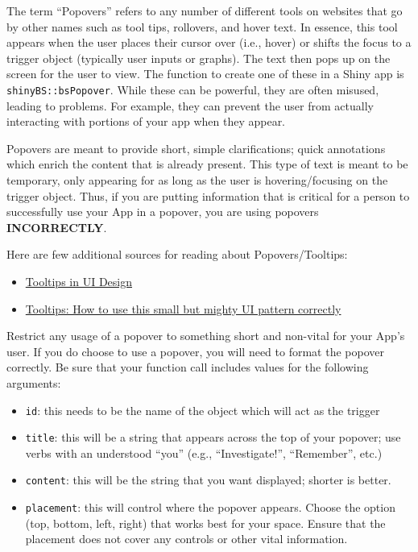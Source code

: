 \documentclass[
]{book}
\providecommand{\tightlist}{%
  \setlength{\itemsep}{0pt}\setlength{\parskip}{0pt}}
\begin{document}
The term ``Popovers'' refers to any number of different tools on websites that go by other names such as tool tips, rollovers, and hover text. In essence, this tool appears when the user places their cursor over (i.e., hover) or shifts the focus to a trigger object (typically user inputs or graphs). The text then pops up on the screen for the user to view. The function to create one of these in a Shiny app is \texttt{shinyBS::bsPopover}. While these can be powerful, they are often misused, leading to problems. For example, they can prevent the user from actually interacting with portions of your app when they appear.

Popovers are meant to provide short, simple clarifications; quick annotations which enrich the content that is already present. This type of text is meant to be temporary, only appearing for as long as the user is hovering/focusing on the trigger object. Thus, if you are putting information that is critical for a person to successfully use your App in a popover, you are using popovers \textbf{INCORRECTLY}.

Here are few additional sources for reading about Popovers/Tooltips:

\begin{itemize}
\tightlist
\item
  \href{https://uxplanet.org/tooltips-in-ui-design-f63e117aa3d1}{Tooltips in UI Design}
\item
  \href{https://www.appcues.com/blog/tooltips}{Tooltips: How to use this small but mighty UI pattern correctly}
\end{itemize}

Restrict any usage of a popover to something short and non-vital for your App's user. If you do choose to use a popover, you will need to format the popover correctly. Be sure that your function call includes values for the following arguments:

\begin{itemize}
\tightlist
\item
  \texttt{id}: this needs to be the name of the object which will act as the trigger
\item
  \texttt{title}: this will be a string that appears across the top of your popover; use verbs with an understood ``you'' (e.g., ``Investigate!'', ``Remember'', etc.)
\item
  \texttt{content}: this will be the string that you want displayed; shorter is better.
\item
  \texttt{placement}: this will control where the popover appears. Choose the option (top, bottom, left, right) that works best for your space. Ensure that the placement does not cover any controls or other vital information.
\end{itemize}
\end{document}
